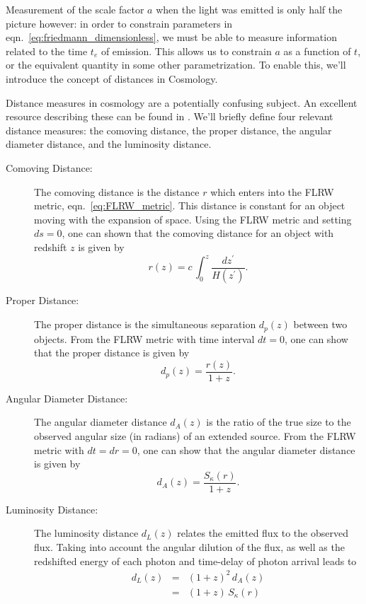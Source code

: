 Measurement of the scale factor $a$ when the light was emitted
is only half the picture however: in order to constrain parameters in
eqn.~\ref{eq:friedmann_dimensionless}, we must be able to measure
information related to the time $t_e$ of emission.  This allows us to
constrain $a$ as a function of $t$, or the equivalent quantity in some
other parametrization.  To enable this, we'll introduce the concept
of distances in Cosmology.

Distance measures in cosmology are a potentially confusing subject.  An
excellent resource describing these can be found in \citet{hogg1999distance}.
We'll briefly define four relevant distance measures: the comoving distance,
the proper distance, the angular diameter distance, and the luminosity
distance.

\begin{description}
  \item[Comoving Distance:] The comoving distance is the distance $r$ which
    enters into the FLRW metric, eqn.~\ref{eq:FLRW_metric}.  This distance is
    constant for an object moving with the expansion of space.  Using the
    FLRW metric and setting $ds=0$, one can shown that the comoving
    distance for an object with redshift $z$ is given by
    \begin{equation}
      \label{eq:comoving_distance}
      r(z) = c\,\int_0^z \frac{dz^\prime}{H(z^\prime)}.
    \end{equation}
  \item[Proper Distance:] The proper distance is the simultaneous separation
    $d_p(z)$ between two objects.  From the FLRW metric with time interval
    $dt=0$, one can show that the proper distance is given by
    \begin{equation}
      \label{eq:proper_distance}
      d_p(z) = \frac{r(z)}{1 + z}.
    \end{equation}
  \item[Angular Diameter Distance:] The angular diameter distance $d_A(z)$
    is the
    ratio of the true size to the observed angular size (in radians) of
    an extended source.  From the FLRW metric with $dt = dr = 0$, one
    can show that the angular diameter distance is given by
    \begin{equation}
      \label{eq:angular_diameter_distance}
      d_A(z) = \frac{S_\kappa(r)}{1 + z}.
    \end{equation}
  \item[Luminosity Distance:] The luminosity distance $d_L(z)$ relates the
    emitted flux to the observed flux.  Taking into account the angular
    dilution of the flux, as well as the redshifted energy of each photon
    and time-delay of photon arrival leads to
    \begin{eqnarray}
      \label{eq:luminosity_distance}
      d_L(z) &=& (1 + z)^2\,d_A(z) \nonumber\\
      &=& (1 + z)\,S_\kappa(r)
    \end{eqnarray}
\end{description}
